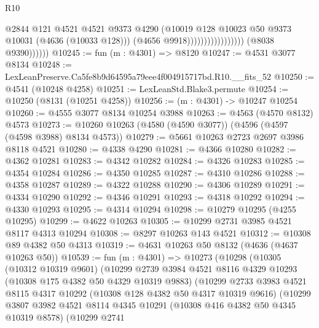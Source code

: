 \begin{lexlean}{R10}
\begin{coremodule}
                                              @2844
                                              @121
                                              @4521
                                              @4521
                                              @9373
                                              @4290
                                              (@10019
                                                @128
                                                @10023
                                                @50
                                                @9373
                                                @10031
                                                (@4636 (@10033 @128)))
                                              (@4656 @9918)))))))))))))))))
              (@8038 @9390))))))
@10245 := fun (m : @4301) => @8120
@10247 := @4531 @3077 @8134
@10248 := LexLeanPreserve.Ca5fe8b9d64595a79eee4f004915717bd.R10.__fits_52
@10250 := @4541 (@10248 @4258)
@10251 := LexLeanStd.Blake3.permute
@10254 := @10250 (@8131 (@10251 @4258))
@10256 := (m : @4301) -> @10247 @10254
@10260 := @4555 @3077 @8134 @10254 @3988
@10263 := @4563 (@4570 @8132) @4573
@10273 := @10260 @10263 (@4580 (@4590 @3077)) (@4596 (@4597 (@4598 @3988) @8134 @4573))
@10279 := @5661 @10263 @2723 @2697 @3986 @8118 @4521
@10280 := @4338 @4290
@10281 := @4366 @10280
@10282 := @4362 @10281
@10283 := @4342 @10282
@10284 := @4326 @10283
@10285 := @4354 @10284
@10286 := @4350 @10285
@10287 := @4310 @10286
@10288 := @4358 @10287
@10289 := @4322 @10288
@10290 := @4306 @10289
@10291 := @4334 @10290
@10292 := @4346 @10291
@10293 := @4318 @10292
@10294 := @4330 @10293
@10295 := @4314 @10294
@10298 := @10279 @10295 (@4255 @10295)
@10299 := @4622 @10263
@10305 := @10299 @2731 @3985 @4521 @8117 @4313 @10294
@10308 := @8297 @10263 @143 @4521
@10312 := @10308 @89 @4382 @50 @4313
@10319 := @4631 @10263 @50 @8132 (@4636 (@4637 @10263 @50))
@10539 := fun (m : @4301) =>
  @10273
    (@10298
      (@10305
        (@10312 @10319 @9601)
        (@10299
          @2739
          @3984
          @4521
          @8116
          @4329
          @10293
          (@10308 @175 @4382 @50 @4329 @10319 @9883)
          (@10299
            @2733
            @3983
            @4521
            @8115
            @4317
            @10292
            (@10308 @128 @4382 @50 @4317 @10319 @9616)
            (@10299
              @3807
              @3982
              @4521
              @8114
              @4345
              @10291
              (@10308 @416 @4382 @50 @4345 @10319 @8578)
              (@10299
                @2741

\end{coremodule}
\end{lexlean}
